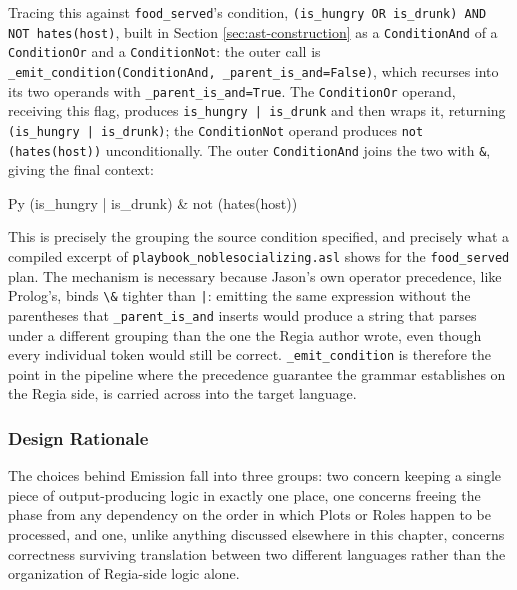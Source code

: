 Tracing this against \lstinline|food_served|'s condition, \lstinline|(is_hungry OR is_drunk) AND NOT hates(host)|, built in Section \ref{sec:ast-construction} as a \lstinline|ConditionAnd| of a \lstinline|ConditionOr| and a \lstinline|ConditionNot|: the outer call is \lstinline|_emit_condition(ConditionAnd, _parent_is_and=False)|, which recurses into its two operands with \lstinline|_parent_is_and=True|. The \lstinline|ConditionOr| operand, receiving this flag, produces \lstinline+is_hungry | is_drunk+ and then wraps it, returning \lstinline+(is_hungry | is_drunk)+; the \lstinline|ConditionNot| operand produces \lstinline|not (hates(host))| unconditionally. The outer \lstinline|ConditionAnd| joins the two with \lstinline|&|, giving the final context:
\begin{codeblock}[]{Py}
(is_hungry | is_drunk) & not (hates(host))
\end{codeblock}
This is precisely the grouping the source condition specified, and precisely what a compiled excerpt of \lstinline|playbook_noblesocializing.asl| shows for the \lstinline|food_served| plan. The mechanism is necessary because Jason's own operator precedence, like Prolog's, binds \lstinline|\&| tighter than \lstinline+|+: emitting the same expression without the parentheses that \lstinline|_parent_is_and| inserts would produce a string that parses under a different grouping than the one the Regia author wrote, even though every individual token would still be correct. \lstinline|_emit_condition| is therefore the point in the pipeline where the precedence guarantee the grammar establishes on the Regia side, is carried across into the target language.

\subsubsection{Design Rationale}
The choices behind Emission fall into three groups: two concern keeping a single piece of output-producing logic in exactly one place, one concerns freeing the phase from any dependency on the order in which Plots or Roles happen to be processed, and one, unlike anything discussed elsewhere in this chapter, concerns correctness surviving translation between two different languages rather than the organization of Regia-side logic alone.

